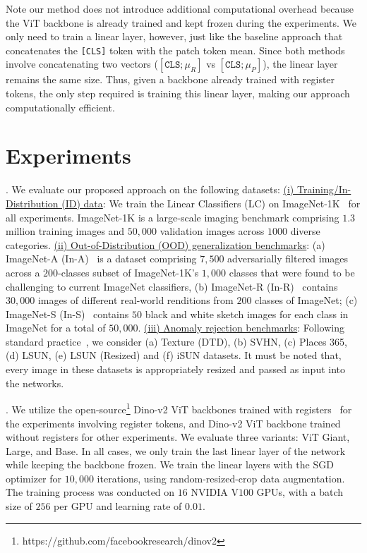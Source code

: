 \documentclass[conference]{IEEEtran}
\begin{document}
Note our method does not introduce additional computational overhead because the ViT backbone is already trained and kept frozen during the experiments. We only need to train a linear layer, however, just like the baseline approach that concatenates the \texttt{[CLS]} token with the patch token mean. Since both methods involve concatenating two vectors ($[\texttt{CLS}; \mu_R]$ vs $[\texttt{CLS}; \mu_P]$), the linear layer remains the same size. Thus, given a backbone already trained with register tokens, the only step required is training this linear layer, making our approach computationally efficient. 






\section{Experiments}
. We evaluate our proposed approach on the following datasets: \underline{(i) Training/In-Distribution (ID) data}: We train the Linear Classifiers (LC) on ImageNet-1K~\cite{russakovsky2015imagenet} for all experiments. ImageNet-1K is a large-scale imaging benchmark comprising $1.3$ million training images and $50,000$ validation images across $1000$ diverse categories. \underline{(ii) Out-of-Distribution (OOD) generalization benchmarks}: (a) ImageNet-A (In-A)~\cite{hendrycks2021natural} is a dataset comprising $7,500$ adversarially filtered images across a $200$-classes subset of ImageNet-1K’s $1,000$ classes that were found to be challenging to current ImageNet classifiers, (b) ImageNet-R (In-R)~\cite{hendrycks2021many} contains $30,000$ images of different real-world renditions from $200$ classes of ImageNet; (c) ImageNet-S (In-S)~\cite{wang2019learning} contains $50$ black and white sketch images for each class in ImageNet for a total of $50,000$. \underline{(iii) Anomaly rejection benchmarks}: Following standard practice~\cite{energyood}, we consider (a) Texture (DTD), (b) SVHN, (c) Places 365, (d) LSUN, (e) LSUN (Resized) and (f) iSUN datasets. It must be noted that, every image in these datasets is appropriately resized and passed as input into the networks.  

. We utilize the open-source\footnote{https://github.com/facebookresearch/dinov2} Dino-v2 ViT backbones trained with registers~\cite{darcet2024vision} for the experiments involving register tokens, and Dino-v2 ViT backbone trained without registers for other experiments.  We evaluate three variants: ViT Giant, Large, and Base. In all cases, we only train the last linear layer of the network while keeping the backbone frozen. We train the linear layers with the SGD optimizer for $10,000$ iterations, using random-resized-crop data augmentation. The training process was conducted on $16$ NVIDIA V$100$ GPUs, with a batch size of $256$ per GPU and learning rate of $0.01$.
\end{document}
